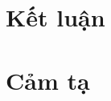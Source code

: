 \documentclass[10pt, conference, a4paper, compsocconf]{IEEEtran}
\begin{document}
\section{Kết luận}

\section*{Cảm tạ}




\end{document}

